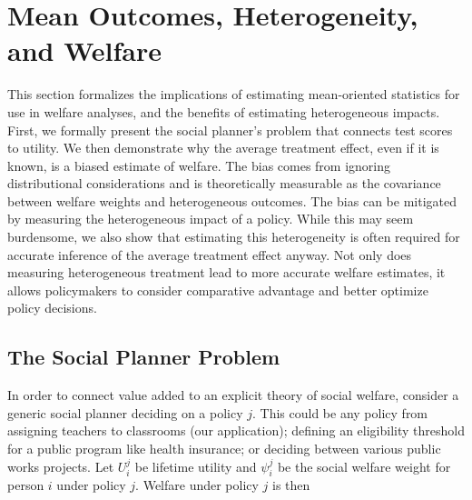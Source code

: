\documentclass[12pt]{article}
\theoremstyle{definition}
\theoremstyle{definition}
\theoremstyle{definition}
\theoremstyle{definition}
\begin{document}
\onehalfspacing


\section{Mean Outcomes, Heterogeneity, and Welfare}
\label{theory_setion}


    This section formalizes the implications of estimating mean-oriented statistics for use in welfare analyses, and the benefits of estimating heterogeneous impacts. First, we formally present the social planner's problem that connects test scores to utility. We then demonstrate why the average treatment effect, even if it is known, is a biased estimate of welfare. The bias comes from ignoring distributional considerations and is  theoretically measurable as the covariance between welfare weights and heterogeneous outcomes. The bias can be mitigated by measuring the heterogeneous impact of a policy. While this may seem burdensome, we also show that estimating this heterogeneity is often required for accurate inference of the average treatment effect anyway.
    Not only does measuring heterogeneous treatment lead to more accurate welfare estimates, it allows policymakers to consider comparative advantage and better optimize policy decisions. 
    
\subsection{The Social Planner Problem}

    
    
    
    In order to connect value added to an explicit theory of social welfare, consider a generic social planner deciding on a policy $j$. This could be any policy from assigning teachers to classrooms (our application);  defining an eligibility threshold for a public program like health insurance; or deciding between various public works projects. Let $U^j_i$ be lifetime utility and $\psi^j_i$ be the social welfare weight for person $i$ under policy $j$. Welfare under policy $j$ is then
        
\end{document}
